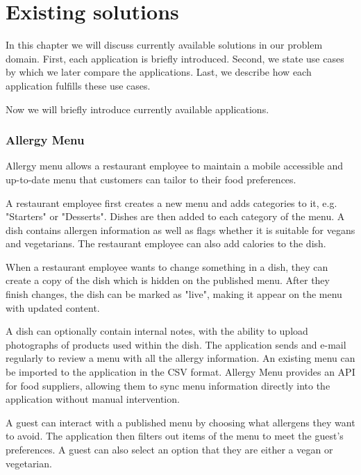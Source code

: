 \chapter{Existing solutions}
In this chapter we will discuss currently available solutions in our problem domain.
First, each application is briefly introduced.
Second, we state use cases by which we later compare the applications.
Last, we describe how each application fulfills these use cases.

Now we will briefly introduce currently available applications.

\subsection*{Allergy Menu}
  Allergy menu allows a restaurant employee to maintain a mobile accessible and up-to-date menu that customers can tailor to their food preferences.
  
  A restaurant employee first creates a new menu and adds categories to it, e.g. "Starters" or "Desserts".
  Dishes are then added to each category of the menu.
  A dish contains allergen information as well as flags whether it is suitable for vegans and vegetarians.
  The restaurant employee can also add calories to the dish.

  When a restaurant employee wants to change something in a dish, they can create a copy of the dish which is hidden on the published menu.
  After they finish changes, the dish can be marked as "live", making it appear on the menu with updated content. 

  A dish can optionally contain internal notes, with the ability to upload photographs of products used within the dish.
  The application sends and e-mail regularly to review a menu with all the allergy information.
  An existing menu can be imported to the application in the CSV format.
  Allergy Menu provides an API for food suppliers, allowing them to sync menu information directly into the application without manual intervention.
  
  A guest can interact with a published menu by choosing what allergens they want to avoid.
  The application then filters out items of the menu to meet the guest's preferences.
  A guest can also select an option that they are either a vegan or vegetarian.
  
